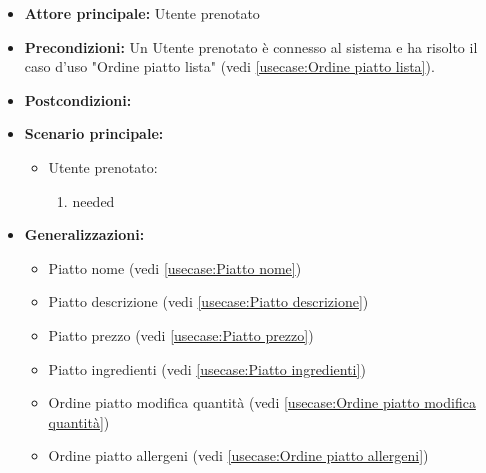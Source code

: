 \label{usecase:Ordine piatto modifica}
\begin{itemize}
\item \textbf{Attore principale:} Utente prenotato
\item \textbf{Precondizioni:}
Un Utente prenotato è connesso al sistema e ha risolto il caso d'uso "Ordine piatto lista" (vedi \autoref{usecase:Ordine piatto lista}).
\item \textbf{Postcondizioni:}
\item \textbf{Scenario principale:}
\begin{itemize}
\item Utente prenotato:
\begin{enumerate}
\item needed
\end{enumerate}
\end{itemize}
\item \textbf{Generalizzazioni:}
\begin{itemize}
\item Piatto nome (vedi \autoref{usecase:Piatto nome})\item Piatto descrizione (vedi \autoref{usecase:Piatto descrizione})\item Piatto prezzo (vedi \autoref{usecase:Piatto prezzo})\item Piatto ingredienti (vedi \autoref{usecase:Piatto ingredienti})\item Ordine piatto modifica quantità (vedi \autoref{usecase:Ordine piatto modifica quantità})\item Ordine piatto allergeni (vedi \autoref{usecase:Ordine piatto allergeni})
\end{itemize}
\end{itemize}